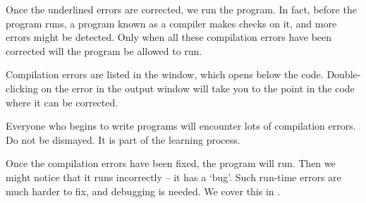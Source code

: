 		Once the underlined errors are corrected, we run the program. In fact, before the program runs, a program known as a compiler makes checks on it, and more errors might be detected. Only when all these compilation errors have been corrected will the program be allowed to run.

		Compilation errors are listed in the  window, which opens below the code. Double-clicking on the error in the output window will take you to the point in the code where it can be corrected.

		Everyone who begins to write programs will encounter lots of compilation errors. Do not be dismayed. It is part of the learning process.

		Once the compilation errors have been fixed, the program will run. Then we might notice that it runs incorrectly – it has a ‘bug’. Such run-time errors are much harder to fix, and debugging is needed. We cover this in .

